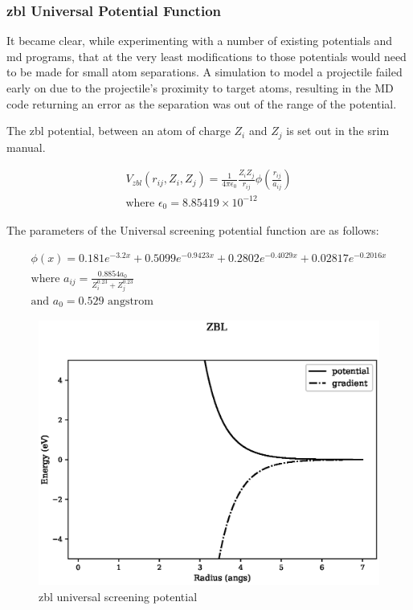 \FloatBarrier
\subsubsection{\acrlong{zbl} Universal Potential Function}
\label{section:ZBL}

It became clear, while experimenting with a number of existing potentials and \acrshort{md} programs, that at the very least modifications to those potentials would need to be made for small atom separations.  A simulation to model a projectile failed early on due to the projectile's proximity to target atoms, resulting in the MD code returning an error as the separation was out of the range of the potential.

The \acrlong{zbl} potential, between an atom of charge $Z_i$ and $Z_j$ is set out in the \acrshort{srim} manual\cite{srimbook}.


\begin{equation}
\begin{split}
V_{zbl}(r_{ij}, Z_i, Z_j) = \frac{1}{4 \pi \epsilon_0} \frac{Z_i Z_j}{r_{ij}} \phi \left( \frac{r_{ij}}{a_{ij}} \right) \\
\text{where } \epsilon_0 = 8.85419\times 10^{-12} 
\end{split}
\label{eq:zblequation}
\end{equation}

The parameters of the Universal screening potential function are as follows:

\begin{equation}
\begin{split}
\phi(x) = 0.181 e^{-3.2x} + 0.5099 e^{-0.9423x} + 0.2802 e^{-0.4029x} + 0.02817 e^{-0.2016x} \\
\text{where } a_{ij} = \frac{0.8854 a_0}{Z^{0.23}_i + Z^{0.23}_j} \\
\text{and } a_0 = 0.529 \text{ angstrom}
\end{split}
\label{eq:screeningPotential}
\end{equation}


\begin{figure}[!htbp]
  \begin{center}
    \includegraphics[width=.6\linewidth]{chapters/interatomic_potential_fitting/plots_pair_potentials/zbl.eps}
    \caption{\acrshort{zbl} universal screening potential}
    \label{fig:zbluniversalscreening}
  \end{center}
\end{figure}


